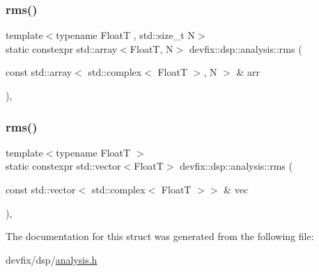 \subsubsection{\texorpdfstring{rms()}{rms()}\hspace{0.1cm}{\footnotesize\ttfamily [2/3]}}
{\footnotesize\ttfamily template$<$typename FloatT , std\+::size\+\_\+t N$>$ \\
static constexpr std\+::array$<$FloatT, N$>$ devfix\+::dsp\+::analysis\+::rms (\begin{DoxyParamCaption}\item[{const std\+::array$<$ std\+::complex$<$ FloatT $>$, N $>$ \&}]{arr }\end{DoxyParamCaption})\hspace{0.3cm}{\ttfamily [inline]}, {\ttfamily [static]}}

\mbox{\label{structdevfix_1_1dsp_1_1analysis_acad800a46b767f69e8df2940694614a4}} 
\subsubsection{\texorpdfstring{rms()}{rms()}\hspace{0.1cm}{\footnotesize\ttfamily [3/3]}}
{\footnotesize\ttfamily template$<$typename FloatT $>$ \\
static constexpr std\+::vector$<$FloatT$>$ devfix\+::dsp\+::analysis\+::rms (\begin{DoxyParamCaption}\item[{const std\+::vector$<$ std\+::complex$<$ FloatT $>$$>$ \&}]{vec }\end{DoxyParamCaption})\hspace{0.3cm}{\ttfamily [inline]}, {\ttfamily [static]}}



The documentation for this struct was generated from the following file\+:\begin{DoxyCompactItemize}
\item 
devfix/dsp/\hyperlink{analysis_8h}{analysis.\+h}\end{DoxyCompactItemize}
